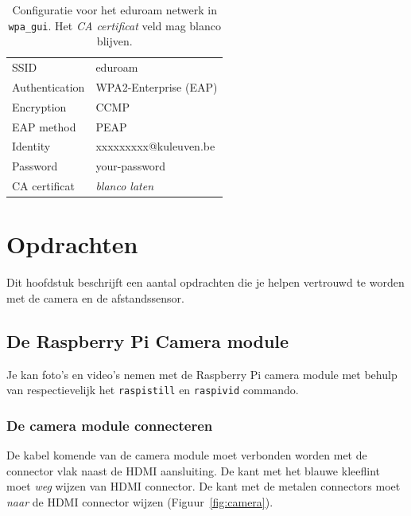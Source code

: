 \documentclass[a4paper]{article}
\begin{document}
  \begin{table}[h!]
    \centering
    \begin{tabular}{ll}
      \hline
      SSID & eduroam \\
      Authentication & WPA2-Enterprise (EAP) \\
      Encryption & CCMP \\
      EAP method & PEAP \\
      Identity & xxxxxxxxx@kuleuven.be \\
      Password & your-password \\
      CA certificat & \emph{blanco laten} \\
      \hline
    \end{tabular}
    \caption{Configuratie voor het eduroam netwerk in
\texttt{wpa\_gui}.  Het \emph{CA certificat} veld mag blanco blijven.}
    \label{table:eduroam}
  \end{table}

  \section{Opdrachten}

    Dit hoofdstuk beschrijft een aantal opdrachten die je helpen
vertrouwd te worden met de camera en de afstandssensor.

  \subsection{De Raspberry Pi Camera module}

    Je kan foto's en video's nemen met de Raspberry Pi camera module
met behulp van respectievelijk het \texttt{raspistill} en
\texttt{raspivid} commando.

    \subsubsection{De camera module connecteren}
  
    De kabel komende van de camera module moet verbonden worden met de
connector vlak naast de HDMI aansluiting.  De kant met het blauwe
kleeflint moet \emph{weg} wijzen van HDMI connector.  De kant met de metalen
connectors moet \emph{naar} de HDMI connector wijzen
(Figuur~\ref{fig:camera}).
\end{document}
